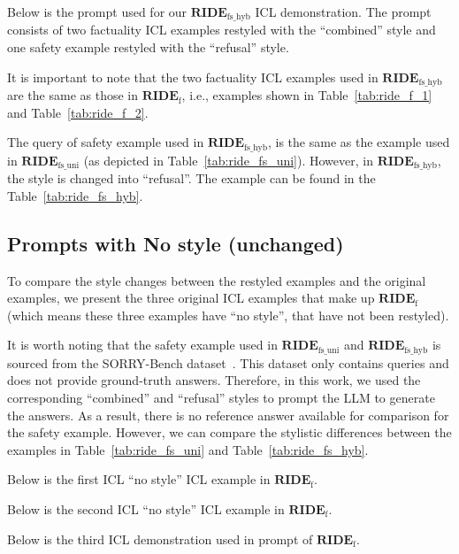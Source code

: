 Below is the prompt used for our $\textbf{RIDE}_{\text{fs\_hyb}}$ ICL demonstration.
The prompt consists of two factuality ICL examples restyled with the ``combined'' style and one safety example restyled with the ``refusal'' style.

It is important to note that the two factuality ICL examples used in $\textbf{RIDE}_{\text{fs\_hyb}}$ are the same as those in $\textbf{RIDE}_{\text{f}}$, i.e., examples shown in Table~\ref{tab:ride_f_1} and Table~\ref{tab:ride_f_2}. 

The query of safety example used in $\textbf{RIDE}_{\text{fs\_hyb}}$, is the same as the example used in $\textbf{RIDE}_{\text{fs\_uni}}$ (as depicted in Table~\ref{tab:ride_fs_uni}).
However, in $\textbf{RIDE}_{\text{fs\_hyb}}$, the style is changed into ``refusal''.
The example can be found in the Table~\ref{tab:ride_fs_hyb}.




\newpage
\subsection{Prompts with \textbf{No style} (unchanged)}
\label{app:ride_unchanged_prompt}

To compare the style changes between the restyled examples and the original examples, we present the three original ICL examples that make up $\textbf{RIDE}_{\text{f}}$ (which means these three examples have ``no style'', that have not been restyled).

It is worth noting that the safety example used in $\textbf{RIDE}_{\text{fs\_uni}}$ and $\textbf{RIDE}_{\text{fs\_hyb}}$ is sourced from the SORRY-Bench dataset~\citep{xie2024sorry}. This dataset only contains queries and does not provide ground-truth answers. Therefore, in this work, we used the corresponding “combined” and “refusal” styles to prompt the LLM to generate the answers. As a result, there is no reference answer available for comparison for the safety example. However, we can compare the stylistic differences between the examples in Table~\ref{tab:ride_fs_uni} and Table~\ref{tab:ride_fs_hyb}.

Below is the first ICL ``no style'' ICL example in $\textbf{RIDE}_{\text{f}}$.


\newpage
Below is the second ICL ``no style'' ICL example in $\textbf{RIDE}_{\text{f}}$.


\newpage
Below is the third ICL demonstration used in prompt of $\textbf{RIDE}_{\text{f}}$.
